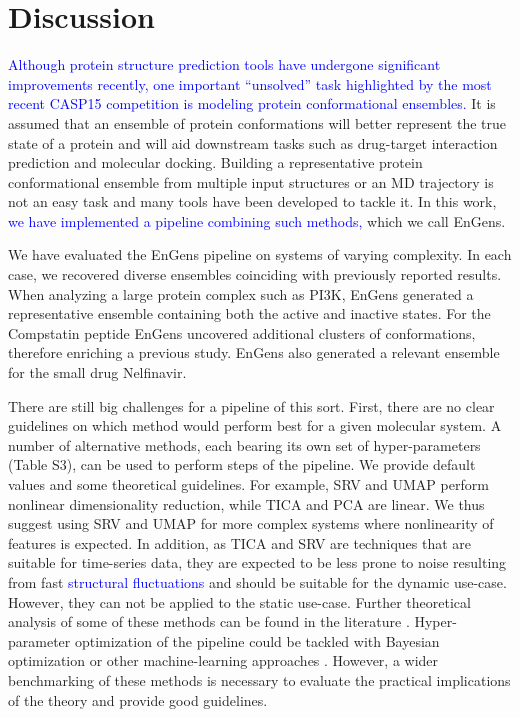 \documentclass[unnumsec,webpdf,contemporary,large,numsquare]{oup-authoring-template}%
\theoremstyle{thmstyleone}%
\theoremstyle{thmstyletwo}%
\theoremstyle{thmstylethree}%
\begin{document}
\section{Discussion}

\textcolor{blue}{Although protein structure prediction tools have undergone significant improvements recently, one important “unsolved” task highlighted by the most recent CASP15 competition is modeling protein conformational ensembles.} It is assumed that an ensemble of protein conformations will better represent the true state of a protein and will aid downstream tasks such as drug-target interaction prediction and molecular docking. Building a representative protein conformational ensemble from multiple input structures or an MD trajectory is not an easy task and many tools have been developed to tackle it. In this work, \textcolor{blue}{we have implemented a pipeline combining such methods,} which we call EnGens. 

We have evaluated the EnGens pipeline on systems of varying complexity. In each case, we recovered diverse ensembles coinciding with previously reported results. When analyzing a large protein complex such as PI3K, EnGens generated a representative ensemble containing both the active and inactive states.  For the Compstatin peptide EnGens uncovered additional clusters of conformations, therefore enriching a previous study. EnGens also generated a relevant ensemble for the small drug Nelfinavir. 

There are still big challenges for a pipeline of this sort. First, there are no clear guidelines on which method would perform best for a given molecular system. A number of alternative methods, each bearing its own set of hyper-parameters (Table S3), can be used to perform steps of the pipeline. We provide default values and some theoretical guidelines. For example, SRV and  UMAP perform nonlinear dimensionality reduction, while TICA and PCA are linear. We thus suggest using SRV and UMAP for more complex systems where nonlinearity of features is expected. In addition, as TICA and SRV are techniques that are suitable for time-series data, they are expected to be less prone to noise resulting from fast \textcolor{blue}{structural fluctuations} and should be suitable for the dynamic use-case. However, they can not be applied to the static use-case. Further theoretical analysis of some of these methods can be found in the literature \citep{glielmo_unsupervised_2021}. Hyper-parameter optimization of the pipeline could be tackled with Bayesian optimization or other machine-learning approaches \citep{lee_adaptive_2022}. However, a wider benchmarking of these  methods is necessary to evaluate the practical implications of the theory and provide good guidelines.
\end{document}

